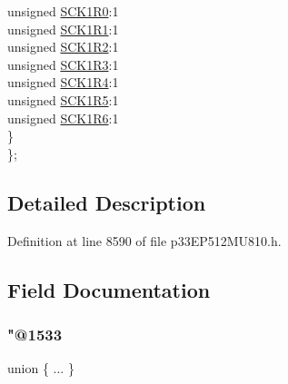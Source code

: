 \begin{DoxyCompactItemize}
\begin{tabbing}
\>\>unsigned \hyperlink{structtag_r_p_i_n_r20_b_i_t_s_aeda38ae6a75340b77335dd7b79738037}{SCK1R0}:1\\
\>\>unsigned \hyperlink{structtag_r_p_i_n_r20_b_i_t_s_a8b0fb6fa6a1d88aab8c8adc1e2493dab}{SCK1R1}:1\\
\>\>unsigned \hyperlink{structtag_r_p_i_n_r20_b_i_t_s_a78a214b884d5f50321899c5d5b4180e9}{SCK1R2}:1\\
\>\>unsigned \hyperlink{structtag_r_p_i_n_r20_b_i_t_s_ad19fe2aad2457f4b7da0c166dc5ce3a7}{SCK1R3}:1\\
\>\>unsigned \hyperlink{structtag_r_p_i_n_r20_b_i_t_s_a66d437f448fa11475e38ca6f29907b4b}{SCK1R4}:1\\
\>\>unsigned \hyperlink{structtag_r_p_i_n_r20_b_i_t_s_a480a2768034d2133d32e503ad91856b0}{SCK1R5}:1\\
\>\>unsigned \hyperlink{structtag_r_p_i_n_r20_b_i_t_s_a6f9f339a90e0d97e133aa7efb8c9d486}{SCK1R6}:1\\
\>\} \\
\}; \\

\end{tabbing}\end{DoxyCompactItemize}


\subsection{Detailed Description}


Definition at line 8590 of file p33\+E\+P512\+M\+U810.\+h.



\subsection{Field Documentation}
\mbox{\label{structtag_r_p_i_n_r20_b_i_t_s_a0291941cf126ff33aa71e40ec671e7e9}} 
\subsubsection{\texorpdfstring{"@1533}{@1533}}
{\footnotesize\ttfamily union \{ ... \} }

\mbox{\label{structtag_r_p_i_n_r20_b_i_t_s_adf71f3d8410c1f1dbbc96680a92c49af}} 
